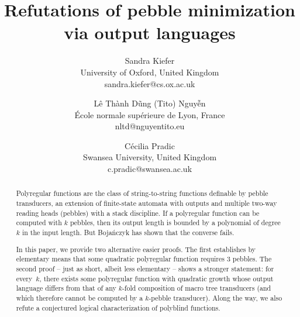 \documentclass{fundam}
\theoremstyle{claimstyle}
\begin{document}
%
\setcounter{page}{1}
%


\title{Refutations of pebble minimization via output languages}


\author{Sandra Kiefer\\ University of Oxford, United Kingdom\\
  sandra.kiefer{@}cs.ox.ac.uk
  \and {\selectfont Lê Thành Dũng (Tito) Nguyễn}\\
  École normale supérieure de Lyon, France\\
  nltd{@}nguyentito.eu
  \and
  Cécilia Pradic\\ Swansea University, United Kingdom\\ c.pradic{@}swansea.ac.uk}


\maketitle


\begin{abstract}
  Polyregular functions are the class of string-to-string functions definable by
  pebble transducers, an extension of finite-state automata with outputs and
  multiple two-way reading heads (pebbles) with a stack discipline. If a polyregular function can be computed with $k$ pebbles, then its output length is bounded by a polynomial of degree $k$ in the input
  length. But
  Bojańczyk has shown that the converse fails.

  In this paper, we provide two alternative easier proofs. The first establishes
  by elementary means that some quadratic polyregular function requires 3
  pebbles. The second proof -- just as short, albeit less elementary -- shows a
  stronger statement: for every~$k$, there exists some polyregular function with
  quadratic growth whose output language differs from that of any $k$-fold
  composition of macro tree transducers (and which therefore cannot be computed
  by a $k$-pebble transducer).
  Along the way, we also refute a conjectured logical characterization of polyblind functions.
\end{abstract}
\end{document}
